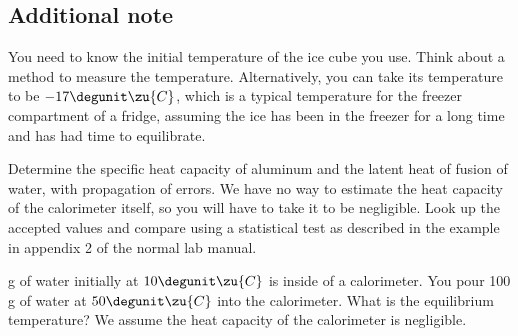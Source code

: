 \subsection*{Additional note}
You need to know the initial temperature of the ice cube you
use. Think about a method to measure the temperature.  Alternatively,
you can take its temperature to be $-17\degunit\zu{C}$, which is a
typical temperature for the freezer compartment of a fridge, assuming
the ice has been in the freezer for a long time and has had time to
equilibrate.


\analysis

Determine the specific heat capacity of aluminum and the latent heat of fusion of water,
with propagation of errors.
We have no way to estimate the heat capacity of the calorimeter itself, so you will have
to take it to be negligible. Look up the accepted values and
compare
using a statistical test as described in the example in appendix 2 of the normal lab manual.

\prelab

 g of water initially at $10\degunit\zu{C}$ is inside of a calorimeter. You pour 100 g of water at $50\degunit\zu{C}$ into the calorimeter. What is the equilibrium temperature? We assume the heat capacity of the calorimeter is negligible. 


